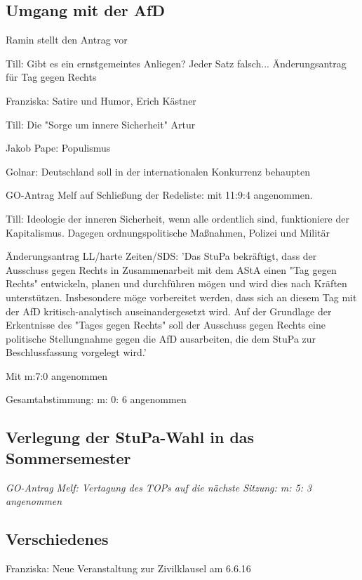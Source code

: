 \documentclass[ngerman,headheight=70pt]{scrartcl}
\begin{document}
    \subsection{Umgang mit der AfD}

    Ramin stellt den Antrag vor

    Till: Gibt es ein ernstgemeintes Anliegen? Jeder Satz falsch... Änderungsantrag für Tag gegen Rechts

    Franziska: Satire und Humor, Erich Kästner

    Till: Die "Sorge um innere Sicherheit"
    Artur

    Jakob Pape: Populismus

    Golnar: Deutschland soll in der internationalen Konkurrenz behaupten

    GO-Antrag Melf auf Schließung der Redeliste: mit 11:9:4 angenommen.

    Till: Ideologie der inneren Sicherheit, wenn alle ordentlich sind, funktioniere
    der Kapitalismus. Dagegen ordnungspolitische Maßnahmen, Polizei und Militär

    Änderungsantrag LL/harte Zeiten/SDS: 'Das StuPa bekräftigt, dass der
    Ausschuss gegen Rechts in Zusammenarbeit mit dem AStA einen "Tag gegen Rechts"
    entwickeln, planen und durchführen mögen und wird dies nach Kräften unterstützen.
    Insbesondere möge vorbereitet werden, dass sich an diesem Tag mit der AfD
    kritisch-analytisch auseinandergesetzt wird. Auf der Grundlage der Erkentnisse
    des "Tages gegen Rechts" soll der Ausschuss gegen Rechts eine politische
    Stellungnahme gegen die AfD ausarbeiten, die dem StuPa zur Beschlussfassung
    vorgelegt wird.'

    Mit m:7:0 angenommen

    Gesamtabstimmung: m: 0: 6 angenommen

    \subsection{Verlegung der StuPa-Wahl in das Sommersemester}

    \textit{GO-Antrag Melf: Vertagung des TOPs auf die nächste Sitzung: m: 5: 3 angenommen}

    \subsection{Verschiedenes}

    Franziska: Neue Veranstaltung zur Zivilklausel am 6.6.16
\end{document}
